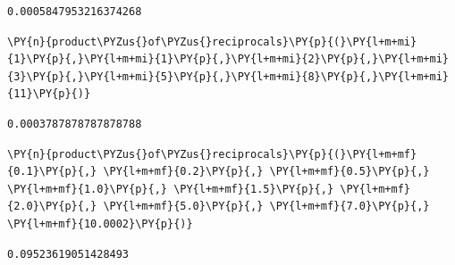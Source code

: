             \begin{tcolorbox}[breakable, size=fbox, boxrule=.5pt, pad at break*=1mm, opacityfill=0]
\begin{Verbatim}[commandchars=\\\{\}]
0.0005847953216374268
\end{Verbatim}
\end{tcolorbox}
        
    \begin{tcolorbox}[breakable, size=fbox, boxrule=1pt, pad at break*=1mm,colback=cellbackground, colframe=cellborder]
\begin{Verbatim}[commandchars=\\\{\}]
\PY{n}{product\PYZus{}of\PYZus{}reciprocals}\PY{p}{(}\PY{l+m+mi}{1}\PY{p}{,}\PY{l+m+mi}{1}\PY{p}{,}\PY{l+m+mi}{2}\PY{p}{,}\PY{l+m+mi}{3}\PY{p}{,}\PY{l+m+mi}{5}\PY{p}{,}\PY{l+m+mi}{8}\PY{p}{,}\PY{l+m+mi}{11}\PY{p}{)}
\end{Verbatim}
\end{tcolorbox}

            \begin{tcolorbox}[breakable, size=fbox, boxrule=.5pt, pad at break*=1mm, opacityfill=0]
\begin{Verbatim}[commandchars=\\\{\}]
0.0003787878787878788
\end{Verbatim}
\end{tcolorbox}
        
    \begin{tcolorbox}[breakable, size=fbox, boxrule=1pt, pad at break*=1mm,colback=cellbackground, colframe=cellborder]
\begin{Verbatim}[commandchars=\\\{\}]
\PY{n}{product\PYZus{}of\PYZus{}reciprocals}\PY{p}{(}\PY{l+m+mf}{0.1}\PY{p}{,} \PY{l+m+mf}{0.2}\PY{p}{,} \PY{l+m+mf}{0.5}\PY{p}{,} \PY{l+m+mf}{1.0}\PY{p}{,} \PY{l+m+mf}{1.5}\PY{p}{,} \PY{l+m+mf}{2.0}\PY{p}{,} \PY{l+m+mf}{5.0}\PY{p}{,} \PY{l+m+mf}{7.0}\PY{p}{,} \PY{l+m+mf}{10.0002}\PY{p}{)}
\end{Verbatim}
\end{tcolorbox}

            \begin{tcolorbox}[breakable, size=fbox, boxrule=.5pt, pad at break*=1mm, opacityfill=0]
\begin{Verbatim}[commandchars=\\\{\}]
0.09523619051428493
\end{Verbatim}
\end{tcolorbox}
        
